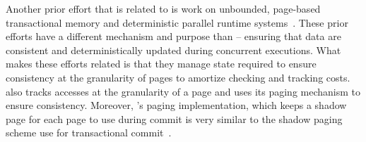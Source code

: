 Another prior effort that is related to \sys is work on unbounded, page-based
transactional memory and deterministic parallel runtime
systems~\cite{pagebasedtm,grace}.  These prior efforts have a different
mechanism and purpose than \sys -- ensuring that data are consistent and
deterministically updated during concurrent executions.  What makes these
efforts related is that they manage state required to ensure consistency at the
granularity of pages to amortize checking and tracking costs.  \sys also tracks
accesses at the granularity of a page and uses its paging mechanism to ensure
consistency.  Moreover, \sys's paging implementation, which keeps a shadow page
for each page to use during commit is very similar to the shadow paging scheme
use for transactional commit~\cite{pagebasedtm}.
